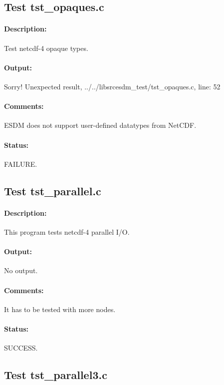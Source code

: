 \subsection{Test tst\_opaques.c}

\paragraph{Description:} Test netcdf-4 opaque types.

\paragraph{Output:} Sorry! Unexpected result, ../../libsrcesdm\_test/tst\_opaques.c, line: 52

\paragraph{Comments:} ESDM does not support user-defined datatypes from NetCDF.

\paragraph{Status:} FAILURE.

\subsection{Test tst\_parallel.c}

\paragraph{Description:} This program tests netcdf-4 parallel I/O.

\paragraph{Output:} No output.

\paragraph{Comments:} It has to be tested with more nodes.

\paragraph{Status:} SUCCESS.

\subsection{Test tst\_parallel3.c}

